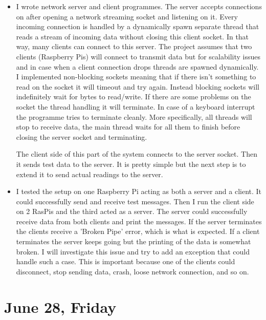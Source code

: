 \documentclass[a4paper,12pt]{article}
\begin{document}
\begin{itemize}
	\item I wrote network server and client programmes. The server accepts connections on after opening a network streaming socket and listening on it. Every incoming connection is handled by a dynamically spawn separate thread that reads a stream of incoming data without closing this client socket. In that way, many clients can connect to this server. The project assumes that two clients (Raspberry Pis) will connect to transmit data but for scalability issues and in case when a client connection drops threads are spawned dynamically. I implemented non-blocking sockets meaning that if there isn't something to read on the socket it will timeout and try again. Instead blocking sockets will indefinitely wait for bytes to read/write. If there are some problems on the socket the thread handling it will terminate. In case of a keyboard interrupt the programme tries to terminate cleanly. More specifically, all threads will stop to receive data, the main thread waits for all them to finish before closing the server socket and terminating.
	
	The client side of this part of the system connects to the server socket. Then it sends test data to the server. It is pretty simple but the next step is to extend it to send actual readings to the server.
	\item I tested the setup on one Raspberry Pi acting as both a server and a client. It could successfully send and receive test messages. Then I run the client side on 2 RasPis and the third acted as a server. The server could successfully receive data from both clients and print the messages. If the server terminates the clients receive a 'Broken Pipe' error, which is what is expected. If a client terminates the server keeps going but the printing of the data is somewhat broken. I will investigate this issue and try to add an exception that could handle such a case. This is important because one of the clients could disconnect, stop sending data, crash, loose network connection, and so on.
\end{itemize}

\section{June 28, Friday}
\end{document}
